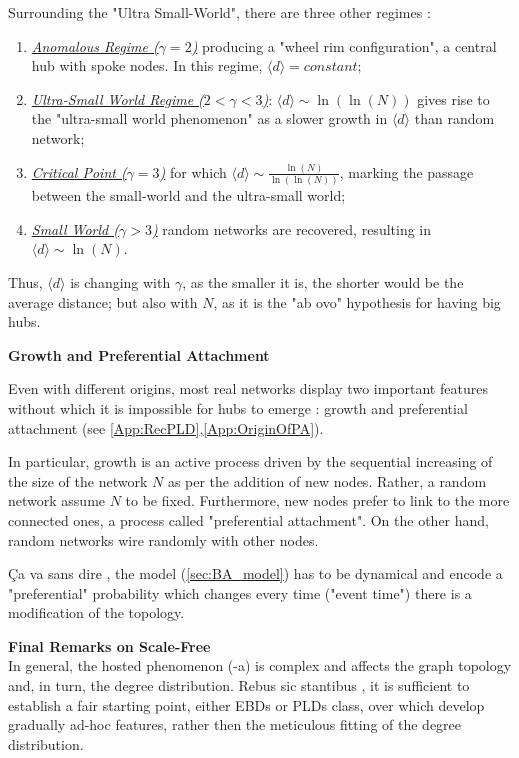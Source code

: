 \documentclass[a4paper,10pt, oneside]{book} %
\theoremstyle{definition}
\begin{document}
Surrounding the "Ultra Small-World", there are three other regimes
\cite{Cohen:2003_SFUSW}:
\begin{enumerate}
	\item \underline{\textit{Anomalous Regime ($\gamma = 2$)}} producing a "wheel rim configuration", 
	a central hub with spoke nodes. In this regime, $\langle d \rangle = constant$;
	\item \underline{\textit{Ultra-Small World Regime ($2 < \gamma < 3$)}}: $\langle d \rangle \sim \ln(\ln(N))$ gives rise to the "ultra-small world phenomenon" as a slower growth in $\langle d \rangle$ than random network;
	\item \underline{\textit{Critical Point ($\gamma = 3$)}} for which $\langle d \rangle \sim \frac{\ln(N)}{\ln(\ln(N))}$, marking the passage between the small-world and the ultra-small world;
	\item \underline{\textit{Small World ($\gamma > 3$)}} random networks are recovered, resulting in $\langle d \rangle \sim \ln(N)$.
\end{enumerate}
Thus, \(\langle d \rangle\) is changing with $\gamma$, as the smaller it is, the shorter would be the average distance; but also with $N$, as it is the "ab ovo" hypothesis for having big hubs.

{\large \textbf{Growth and Preferential Attachment}} 

Even with different origins, most real networks display two important features without which it is impossible for hubs to emerge \cite{barabasi::2016networkbook}: growth and preferential attachment (see \autoref{App:RecPLD},\autoref{App:OriginOfPA}). 

In particular, growth is an active process driven by the sequential increasing of the size of the network $N$ as per the addition of new nodes. Rather, a random network assume $N$ to be fixed. \newline
Furthermore, new nodes prefer to link to the more connected ones, a process called "preferential attachment". On the other hand, random networks wire randomly with other nodes.

Ça va sans dire \label{cit:AMarzo}, the model (\autoref{sec:BA_model}) has to be dynamical and encode a "preferential" probability which changes every time ("event time") there is a modification of the topology. 

{\large \textbf{Final Remarks on Scale-Free}} \\
In general, the hosted phenomenon (-a) is complex and affects the graph topology and, in turn, the degree distribution. Rebus sic stantibus \label{cit:DarioMassa}, it is sufficient to establish a fair starting point, either EBDs or PLDs class, over which develop gradually ad-hoc features, rather then the meticulous fitting of the degree distribution.
\end{document}
